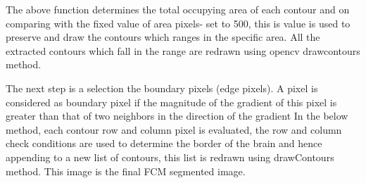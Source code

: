  The above function determines the total occupying area of each contour
and on comparing with the fixed value of area pixels- set to 500, this
is value is used to preserve and draw the contours which ranges in the
specific area. All the extracted contours which fall in the range are
redrawn using opencv drawcontours method.

The next step is a selection the boundary pixels (edge pixels). A pixel
is considered as boundary pixel if the magnitude of the gradient of this
pixel is greater than that of two neighbors in the direction of the
gradient In the below method, each contour row and column pixel is
evaluated, the row and column check conditions are used to determine the
border of the brain and hence appending to a new list of contours, this
list is redrawn using drawContours method. This image is the final FCM
segmented image.

